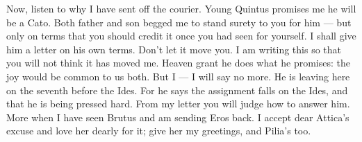  Now, listen to why I have sent off the courier. Young Quintus promises me he will be a Cato. Both father and son begged me to stand surety to you for him --- but only on terms that you should credit it once you had seen for yourself. I shall give him a letter on his own terms. Don't let it move you. I am writing this so that you will not think it has moved me. Heaven grant he does what he promises: the joy would be common to us both. But I --- I will say no more. He is leaving here on the seventh before the Ides. For he says the assignment falls on the Ides, and that he is being pressed hard. From my letter you will judge how to answer him. More when I have seen Brutus and am sending Eros back. I accept dear Attica's excuse and love her dearly for it; give her my greetings, and Pilia's too.
